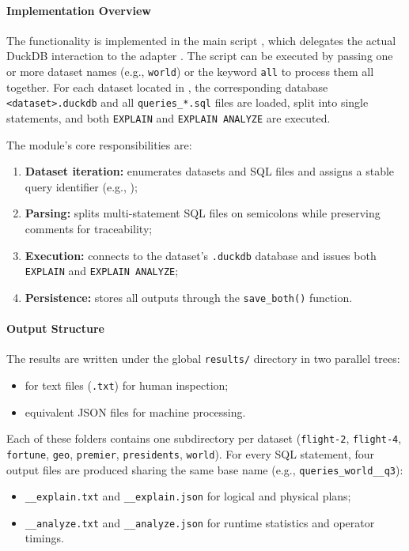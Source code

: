 \documentclass[12pt,a4paper]{article}
\begin{document}
\paragraph{Implementation Overview}
The functionality is implemented in the main script
, which delegates the
actual DuckDB interaction to the adapter
. The script can be executed by passing
one or more dataset names (e.g., \texttt{world}) or the keyword
\texttt{all} to process them all together. For each dataset located in
, the corresponding database
\texttt{<dataset>.duckdb} and all \texttt{queries\_*.sql} files are loaded,
split into single statements, and both \texttt{EXPLAIN} and
\texttt{EXPLAIN ANALYZE} are executed.

The module’s core responsibilities are:
\begin{enumerate}
  \item \textbf{Dataset iteration:} enumerates datasets and SQL files and assigns a stable query identifier
        (e.g., );
  \item \textbf{Parsing:} splits multi-statement SQL files on semicolons while preserving comments for traceability;
  \item \textbf{Execution:} connects to the dataset’s \texttt{.duckdb} database and issues both \texttt{EXPLAIN} and
        \texttt{EXPLAIN ANALYZE};
  \item \textbf{Persistence:} stores all outputs through the \texttt{save\_both()} function.
\end{enumerate}

\paragraph{Output Structure}
The results are written under the global \texttt{results/} directory in two
parallel trees:
\begin{itemize}
  \item {} for text files (\texttt{.txt}) for human inspection;
  \item {} equivalent JSON files for machine processing.
\end{itemize}

Each of these folders contains one subdirectory per dataset
(\texttt{flight-2}, \texttt{flight-4}, \texttt{fortune}, \texttt{geo},
\texttt{premier}, \texttt{presidents}, \texttt{world}). For every SQL statement,
four output files are produced sharing the same base name (e.g.,
\texttt{queries\_world\_\_q3}):
\begin{itemize}
  \item \texttt{\_\_explain.txt} and \texttt{\_\_explain.json} for logical and physical plans;
  \item \texttt{\_\_analyze.txt} and \texttt{\_\_analyze.json} for runtime statistics and operator timings.
\end{itemize}
\end{document}
